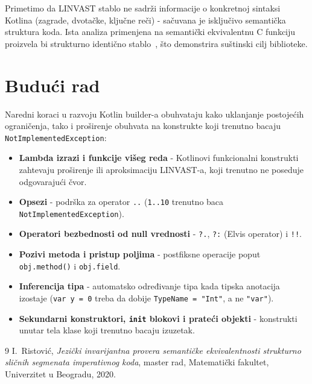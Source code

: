 \documentclass[a4paper]{article}
\begin{document}
Primetimo da LINVAST stablo ne sadrži informacije o konkretnoj sintaksi Kotlina
(zagrade, dvotačke, ključne reči) - sačuvana je isključivo semantička struktura
koda. Ista analiza primenjena na semantički ekvivalentnu C funkciju proizvela bi
strukturno identično stablo~\cite{ristovic2020}, što demonstrira suštinski cilj
biblioteke.

\section{Budući rad}
\label{sec:future}

Naredni koraci u razvoju Kotlin builder-a obuhvataju kako uklanjanje
postojećih ograničenja, tako i proširenje obuhvata na konstrukte koji
trenutno bacaju \texttt{NotImplementedException}:

\begin{itemize}
    \item \textbf{Lambda izrazi i funkcije višeg reda} - Kotlinovi
          funkcionalni konstrukti zahtevaju proširenje ili aproksimaciju
          LINVAST-a, koji trenutno ne poseduje odgovarajući čvor.
    \item \textbf{Opsezi} - podrška za operator \texttt{..}
          (\texttt{1..10} trenutno baca \texttt{NotImplementedException}).
    \item \textbf{Operatori bezbednosti od null vrednosti} -
          \texttt{?.}, \texttt{?:} (Elvis operator) i \texttt{!!}.
    \item \textbf{Pozivi metoda i pristup poljima} - postfiksne operacije
          poput \texttt{obj.method()} i \texttt{obj.field}.
    \item \textbf{Inferencija tipa} - automatsko određivanje tipa kada
          tipska anotacija izostaje (\texttt{var y = 0} treba da dobije
          \texttt{TypeName = "Int"}, a ne \texttt{"var"}).
    \item \textbf{Sekundarni konstruktori, \texttt{init} blokovi i
          prateći objekti} - konstrukti unutar tela klase koji trenutno
          bacaju izuzetak.
\end{itemize}

\begin{thebibliography}{9}
    I.\ Ristović,
    \textit{Jezički invarijantna provera semantičke ekvivalentnosti strukturno
    sličnih segmenata imperativnog koda},
    master rad, Matematički fakultet, Univerzitet u Beogradu, 2020.
\end{thebibliography}
\end{document}

